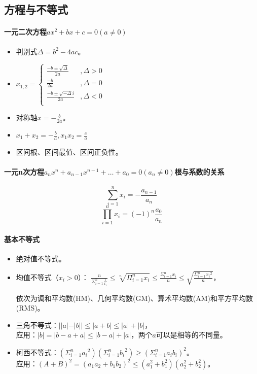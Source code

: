 \documentclass[
12pt, %
a4paper, 
oneside, %
headinclude,footinclude, %
]{scrartcl}
\begin{document}
\subsection{方程与不等式}
\paragraph{一元二次方程$ ax^2 + bx + c = 0(a \neq 0) $}
\begin{itemize}
\item 判别式$ \varDelta = b^2 - 4ac $。
\item 
$
x_{1,2}=
\begin{cases}
\frac{-b \pm \sqrt{\varDelta}}{2a} &, \varDelta > 0 \\
\frac{-b}{2a} &, \varDelta = 0 \\
\frac{-b \pm \sqrt{-\varDelta}i}{2a} &, \varDelta < 0 \\
\end{cases}
$
\item 对称轴$ x = -\frac{b}{2a} $。
\item $ x_1 + x_2 = -\frac{b}{a}, x_1 x_2 = \frac{c}{a} $
\item 区间根、区间最值、区间正负性。
\end{itemize}
\paragraph{一元n次方程$ a_n x^n + a_{n - 1} x^{n - 1} + \dots + a_0 = 0 (a_n \neq 0) $根与系数的关系}
$$ \sum_{i = 1}^{n}x_i = -\frac{a_{n - 1}}{a_n} $$
$$ \prod_{i = 1}^{n}x_i = (-1)^n \frac{a_0}{a_n} $$ 
\paragraph{基本不等式}
\begin{itemize}
\item 绝对值不等式。
\item 均值不等式（$ x_i > 0 $）：
$
\frac{n}{\Sigma_{i = 1}^n \frac{1}{x_i}}
\leq \sqrt[n]{\Pi_{i = 1}^n x_i}
\leq \frac{\Sigma_{i = 1}^n x_i}{n}
\leq \sqrt{\frac{\Sigma_{i = 1}^n {x_i}^2}{n}}
$，

依次为调和平均数(HM)、几何平均数(GM)、算术平均数(AM)和平方平均数(RMS)。
\item 三角不等式：$ ||a|-|b|| \leq |a + b| \leq |a| + |b|$， \\
应用：$ |b| = |b - a + a| \leq |b - a| + |a| $，两个$ a $可以是相等的不同量。
\item 柯西不等式：$ (\Sigma_{i = 1}^n {a_i}^2)(\Sigma_{i = 1}^n {b_i}^2)\geq (\Sigma_{i=1}^n {a_i}{b_i})^2 $。 \\
应用：$ (A + B)^2 = (a_1 a_2 + b_1 b_2)^2 \leq (a_1^2 + b_1^2)(a_2^2 + b_2^2) $。
\end{itemize}
\end{document}
